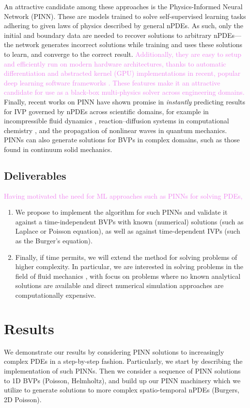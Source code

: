 \documentclass[11pt]{article}
\newcommand{\newcontent}[1]{\textcolor{violet}{#1}}
\begin{document}
An attractive candidate among these approaches is the Physics-Informed Neural
Network (PINN). These are models trained to solve self-supervised learning
tasks adhering to given laws of physics \cite{raissi2019physics} described
by general nPDEs. As such, only the initial and boundary data are needed to
recover solutions to arbitrary nPDEs---the network generates incorrect
solutions while training and uses these solutions to learn, and
converge to the correct result.
\newcontent{
Additionally, they are easy to setup and efficiently run on modern hardware architectures,
thanks to automatic differentiation and abstracted kernel (GPU) implementations in
recent, popular deep learning software frameworks \cite{paszke2019pytorch}.
These features make it an attractive candidate for use as a black-box
multi-physics solver across engineering domains.
}
Finally, recent works on PINN have shown promise in
\emph{instantly} predicting results for IVP governed by nPDEs across
scientific domains, for example in
incompressible fluid dynamics \cite{jin2020nsfnets,raissi2020hidden}, reaction--diffusion systems in
computational chemistry \cite{raissi2019physics}, and the propagation of nonlinear
waves in quantum mechanics. PINNs can also generate solutions for
BVPs in complex domains, such as those found in continuum
solid mechanics.

\subsection{Deliverables}
\label{sec:org585095b}
\newcontent{
Having motivated the need for ML approaches such as PINNs for solving PDEs,
}
\begin{enumerate}
\item We propose to implement the algorithm for such PINNs and validate it
against a time-independent BVPs with known (numerical) solutions (such as
Laplace or Poisson equation), as well as against time-dependent IVPs (such
as the Burger’s equation).
\item Finally, if time permits, we will extend the method for solving problems
of higher complexity. In particular, we are interested in solving problems
in the field of fluid mechanics \cite{jin2020nsfnets,raissi2020hidden}, with
focus on problems where no known analytical solutions are available
and direct numerical simulation approaches are computationally expensive.
\end{enumerate}

\section{Results}
\label{sec:orgd8203df}
We demonstrate our results by considering PINN solutions to increasingly
complex PDEs in a step-by-step fashion. Particularly, we start by
describing the implementation of such PINNs. Then we consider a sequence of
PINN solutions to 1D BVPs (Poisson, Helmholtz), and build up our PINN machinery
which we utilize to generate solutions to more complex spatio-temporal nPDEs
(Burgers, 2D Poisson).
\end{document}
